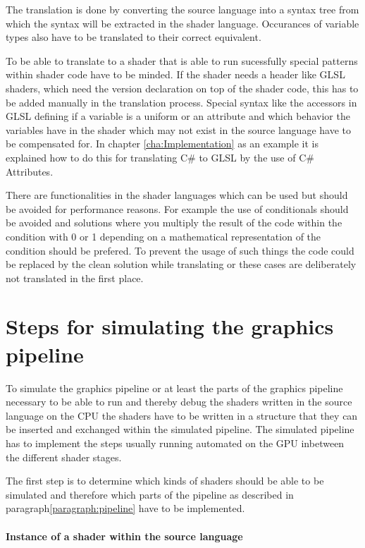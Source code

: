 The translation is done by converting the source language into a syntax tree from which the syntax will be extracted in the shader language. Occurances  of variable types also have to be translated to their correct equivalent.

To be able to translate to a shader that is able to run sucessfully special patterns within shader code have to be minded. If the shader needs a header like GLSL shaders, which need the version declaration on top of the shader code, this has to be added manually in the translation process. Special syntax like the accessors in GLSL defining if a variable is a uniform or an attribute and which behavior the variables have in the shader which may not exist in the source language have to be compensated for. In chapter \ref{cha:Implementation} as an example it is explained how to do this for translating C\# to GLSL by the use of C\# Attributes.

There are functionalities in the shader languages which can be used but should be avoided for performance reasons. For example the use of conditionals should be avoided and solutions where you multiply the result of the code within the condition with 0 or 1 depending on a mathematical representation of the condition should be prefered. To prevent the usage of such things the code could be replaced by the clean solution while translating or these cases are deliberately not translated in the first place.

\section{Steps for simulating the graphics pipeline}
\label{section:contribution_simulating}

To simulate the graphics pipeline or at least the parts of the graphics pipeline necessary to be able to run and thereby debug the shaders written in the source language on the CPU the shaders have to be written in a structure that they can be inserted and exchanged within the simulated pipeline. The simulated pipeline has to implement the steps usually running automated on the GPU inbetween the different shader stages.

The first step is to determine which kinds of shaders should be able to be simulated and therefore which parts of the pipeline as described in paragraph\ref{paragraph:pipeline} have to be implemented.

\paragraph{Instance of a shader within the source language}

